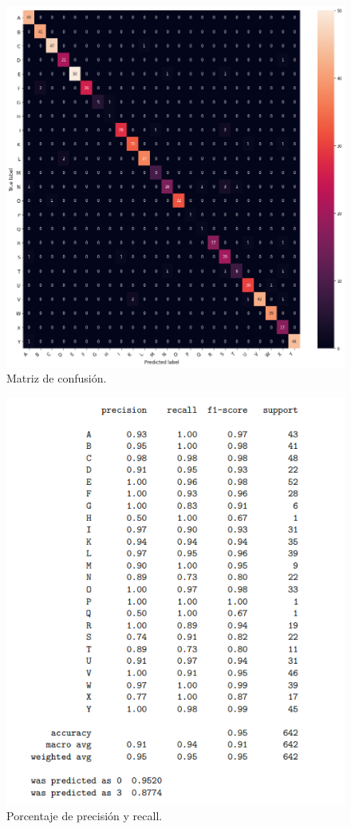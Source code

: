 \documentclass[../main.tex]{subfiles}
\begin{document}
\begin{figure}[h]
\centering 
\includegraphics[width=1\textwidth]{notebook/output_10_0.png}
\caption{Matriz de confusión.}
\label{figure31}
\end{figure}

\begin{figure}[h]
\centering 
\includegraphics[width=1\textwidth]{images/modelo/recall.PNG}
\caption{Porcentaje de precisión y recall.}
\label{figure32}
\end{figure}
\end{document}

